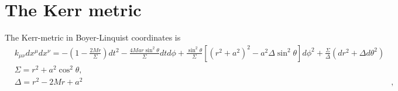 \documentclass[aps,prd,amsmath,showpacs,amssymb,superscriptaddress,nofootinbib,longbibliography,eqsecnum,preprintnumbers]{revtex4-1}
\begin{document}
% 
% 
%
 
\appendix

\section{The Kerr metric}
\label{sec:Kerr}
The Kerr-metric in Boyer-Linquist
coordinates is
\begin{align}
&k_{\mu\nu}dx^\mu dx^\nu=-\left(1-\frac{2Mr}{\Sigma}\right)dt^2 
-\frac{4Mar\sin^2\theta}{\Sigma}dtd\phi
+\frac{\sin^2\theta}{\Sigma}\left[(r^2+a^2)^2-a^2\Delta \sin^2\theta \right]d\phi^2
+\frac{\Sigma}{\Delta}(dr^2+\Delta d\theta^2)
\nonumber \\
&\Sigma=r^2+a^2\cos^2\theta, \nonumber \\
 &\Delta =r^2-2Mr+a^2&,
\end{align}
\end{document}
